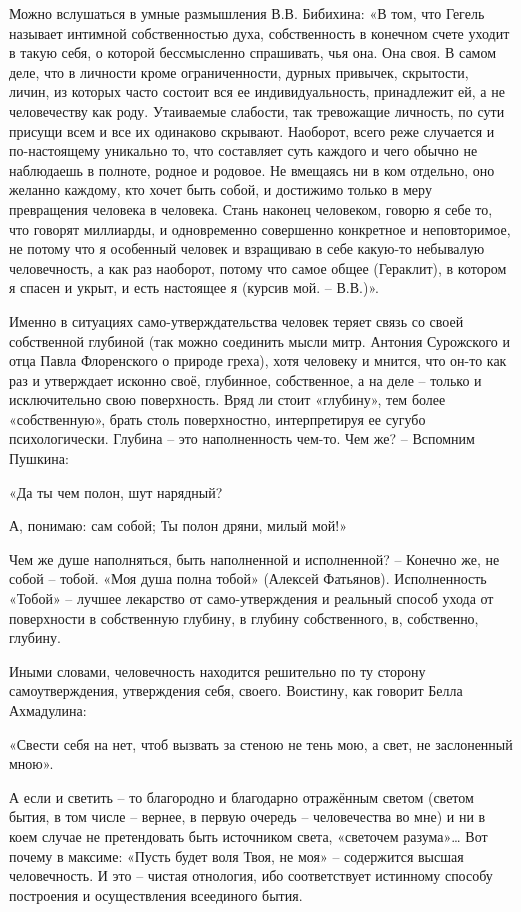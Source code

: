 Можно вслушаться в умные размышления В.В. Бибихина:  «В том, что Гегель
называет интимной собственностью духа, собственность в конечном счете уходит в
такую себя, о которой бессмысленно спрашивать, чья она. Она своя.   В самом
деле, что в личности кроме ограниченности, дурных привычек, скрытости, личин,
из которых часто состоит вся ее индивидуальность, принадлежит ей, а не
человечеству как роду. Утаиваемые слабости, так тревожащие личность, по сути
присущи всем и все их одинаково скрывают. Наоборот, всего реже случается и
по-настоящему уникально то, что составляет суть каждого и чего обычно не
наблюдаешь в полноте, родное и родовое. Не вмещаясь ни в ком отдельно, оно
желанно каждому, кто хочет быть собой, и достижимо только в меру превращения
человека в человека. Стань наконец человеком, говорю я себе то, что говорят
миллиарды, и одновременно совершенно конкретное и неповторимое, не потому что я
особенный человек и взращиваю в себе какую-то небывалую человечность, а как раз
наоборот, потому что самое общее (Гераклит), в котором я спасен и укрыт, и есть
настоящее я (курсив мой. – В.В.)».

Именно в ситуациях само-утверждательства человек теряет связь со своей
собственной глубиной (так можно соединить мысли митр. Антония Сурожского и отца
Павла Флоренского о природе греха), хотя человеку и мнится, что он-то как раз и
утверждает исконно своё, глубинное, собственное, а на деле – только и
исключительно свою поверхность.  Вряд ли стоит «глубину», тем более
«собственную», брать столь поверхностно,  интерпретируя ее сугубо
психологически. Глубина – это наполненность чем-то. Чем же? – Вспомним Пушкина:

«Да ты чем полон, шут нарядный?

 А, понимаю: сам собой;
 Ты полон дряни, милый мой!»

Чем же душе наполняться, быть наполненной и исполненной? – Конечно же, не собой
– тобой.  «Моя душа полна тобой» (Алексей Фатьянов). Исполненность «Тобой» –
лучшее лекарство от само-утверждения и реальный способ ухода от поверхности в
собственную глубину, в глубину собственного, в, собственно, глубину. 

Иными словами, человечность находится решительно по ту сторону самоутверждения, утверждения себя, своего. Воистину, как говорит Белла Ахмадулина:  

«Свести себя на нет,
чтоб вызвать за стеною
не тень мою, а свет,  
не заслоненный мною». 

А если и светить – то благородно и благодарно отражённым светом (светом бытия,
в том числе – вернее, в первую очередь – человечества во мне) и ни в коем
случае не претендовать быть источником света, «светочем разума»…  Вот почему в
максиме: «Пусть будет воля Твоя, не моя» – содержится высшая человечность. И
это – чистая отнология, ибо соответствует истинному способу построения и
осуществления всеединого бытия.

